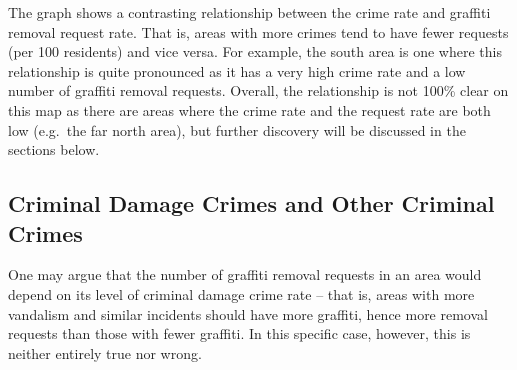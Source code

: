 \documentclass[
]{report}
\begin{document}
The graph shows a contrasting relationship between the crime rate and
graffiti removal request rate. That is, areas with more crimes tend to
have fewer requests (per 100 residents) and vice versa. For example, the
south area is one where this relationship is quite pronounced as it has
a very high crime rate and a low number of graffiti removal requests.
Overall, the relationship is not 100\% clear on this map as there are
areas where the crime rate and the request rate are both low (e.g.~the
far north area), but further discovery will be discussed in the sections
below.

\hypertarget{criminal-damage-crimes-and-other-criminal-crimes}{%
\subsection{Criminal Damage Crimes and Other Criminal
Crimes}\label{criminal-damage-crimes-and-other-criminal-crimes}}

One may argue that the number of graffiti removal requests in an area
would depend on its level of criminal damage crime rate -- that is,
areas with more vandalism and similar incidents should have more
graffiti, hence more removal requests than those with fewer graffiti. In
this specific case, however, this is neither entirely true nor wrong.
\end{document}
